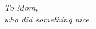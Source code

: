 {}

\vspace*{3cm}

\begingroup
\setlength{\parindent}{0cm}
\textit{To Mom,\\
\hspace*{5mm}who did something nice.}
\endgroup

